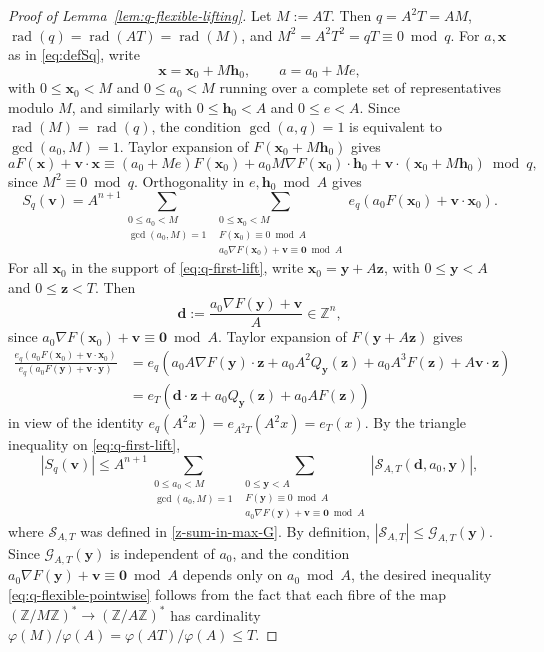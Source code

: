 \documentclass[a4paper,11pt, twoside,reqno]{amsart}
\theoremstyle{plain}
\theoremstyle{definition}
\theoremstyle{remark}
\newcommand{\bfh}{\bm{h}}
\newcommand{\bfv}{\bm{v}}
\newcommand{\bfx}{\bm{x}}
\newcommand{\bfy}{\bm{y}}
\newcommand{\bfz}{\bm{z}}
\newcommand{\bfd}{\bm{d}}
\newcommand{\ZZ}{\mathbb{Z}}
\renewcommand{\le}{\leqslant}
\newcommand{\rad}{\operatorname{rad}}
\numberwithin{equation}{section}
\begin{document}
\begin{proof}
[Proof of Lemma~\ref{lem:q-flexible-lifting}]
Let \(M:=AT\).
Then \(q=A^2T=AM\),
$\rad(q)=\rad(AT)=\rad(M)$,
and $M^2=A^2T^2=qT\equiv 0\bmod{q}$.
For $a,\bfx$ as in \eqref{eq:defSq},
write
\[
 \bfx=\bfx_0+M\bfh_0,\qquad
 a=a_0+Me,
\]
with $0\le \bfx_0<M$ and $0\le a_0<M$
running over a complete set of representatives modulo $M$,
and similarly with $0\le \bfh_0<A$ and $0\le e<A$.
Since \(\rad(M)=\rad(q)\),
the condition $\gcd(a,q)=1$ is equivalent to $\gcd(a_0,M)=1$.
Taylor expansion of $F(\bfx_0+M\bfh_0)$ gives
\begin{equation*}
a F(\bfx)+\bfv\cdot\bfx
\equiv (a_0+Me) F(\bfx_0) + a_0 M\nabla F(\bfx_0)\cdot\bfh_0
+ \bfv\cdot(\bfx_0+M\bfh_0) \bmod{q},
\end{equation*}
since $M^2 \equiv 0\bmod{q}$.
Orthogonality in \(e,\bfh_0\bmod{A}\) gives
\begin{equation}
\label{eq:q-first-lift}
S_q(\bfv)=A^{n+1}
\sum_{\substack{0\le a_0<M \\ \gcd(a_0,M)=1}}
\sum_{\substack{0\le \bfx_0<M\\
F(\bfx_0)\equiv 0\bmod{A}\\
a_0\nabla F(\bfx_0)+\bfv\equiv \bm0\bmod{A}}}
e_q(a_0 F(\bfx_0)+\bfv\cdot\bfx_0).
\end{equation}
For all $\bfx_0$ in the support of \eqref{eq:q-first-lift},
write \(\bfx_0=\bfy+A\bfz\), with
$0\le \bfy<A$ and $0\le \bfz<T$.
Then $$\bfd := \frac{a_0\nabla F(\bfy)+\bfv}{A} \in \ZZ^n,$$
since $a_0\nabla F(\bfx_0)+\bfv\equiv \bm0\bmod{A}$.
Taylor expansion of $F(\bfy+A\bfz)$ gives
\begin{equation*}
\begin{split}
\frac{e_q(a_0 F(\bfx_0)+\bfv\cdot\bfx_0)}{e_q(a_0 F(\bfy) + \bfv\cdot\bfy)}
&= e_q(a_0 A\nabla F(\bfy)\cdot\bfz
+ a_0 A^2Q_{\bfy}(\bfz) + a_0 A^3F(\bfz)
+ A\bfv\cdot \bfz) \\
&= e_T(\bfd\cdot\bfz+a_0 Q_{\bfy}(\bfz)+a_0 A F(\bfz))
\end{split}
\end{equation*}
in view of the identity $e_q(A^2x) = e_{A^2T}(A^2x) = e_T(x)$.
By the triangle inequality on \eqref{eq:q-first-lift},
\begin{equation*}
|S_q(\bfv)|
\le A^{n+1}
\sum_{\substack{0\le a_0<M \\ \gcd(a_0,M)=1}}
\sum_{\substack{0\le \bfy<A\\
F(\bfy)\equiv 0\bmod{A}\\
a_0\nabla F(\bfy)+\bfv\equiv \bm0\bmod{A}}}
|\mathcal{S}_{A,T}(\bfd,a_0,\bfy)|,
\end{equation*}
where $\mathcal{S}_{A,T}$ was defined in \eqref{z-sum-in-max-G}.
By definition, $|\mathcal{S}_{A,T}|
\le \mathcal G_{A,T}(\bfy)$.
Since $\mathcal G_{A,T}(\bfy)$ is independent of $a_0$,
and the condition $a_0\nabla F(\bfy)+\bfv\equiv \bm0\bmod{A}$
depends only on $a_0\bmod{A}$,
the desired inequality \eqref{eq:q-flexible-pointwise} follows
from the fact that each fibre of the map $(\ZZ/M\ZZ)^\ast \to (\ZZ/A\ZZ)^\ast$
has cardinality $\varphi(M)/\varphi(A)
= \varphi(AT)/\varphi(A) \le T$.
\end{proof}
\end{document}
